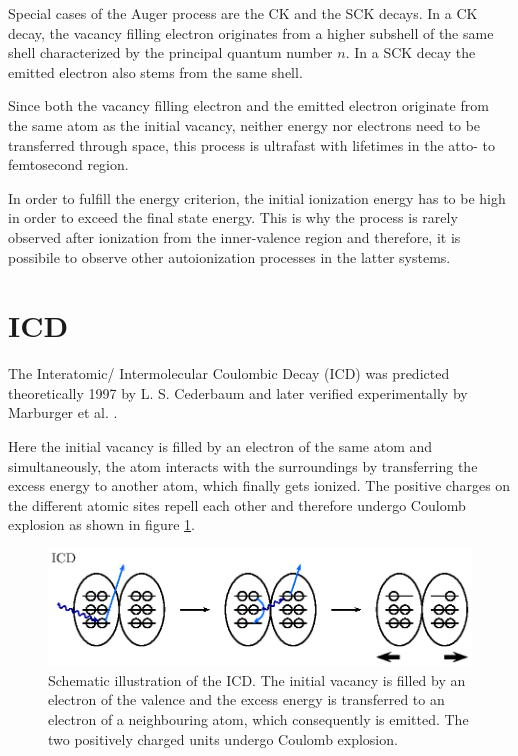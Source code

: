 Special cases of the Auger process are the \ac{CK} and the \ac{SCK} decays.
In a \ac{CK} decay, the vacancy filling electron originates from a higher subshell
of the same shell characterized by the principal quantum number $n$. In a \ac{SCK}
decay the emitted electron also stems from the same shell. \cite{Coster35}

Since both the vacancy filling electron and the emitted electron originate
from the same atom as the initial vacancy, neither energy nor electrons need
to be transferred through space, this process is ultrafast with lifetimes
in the atto- to femtosecond region. \cite{}

In order to fulfill the energy criterion, the initial ionization energy has to
be high in order to exceed the final state energy. This is why
the process is rarely observed after
ionization from the inner-valence region and therefore, it is possibile to
observe other autoionization processes in the latter systems.

\section{\acl{ICD}}
The Interatomic/ Intermolecular Coulombic Decay (ICD) was predicted
theoretically 1997 by L. S. Cederbaum \cite{Cederbaum97}
and later verified experimentally by Marburger et al. \cite{Marburger03}.

Here the initial vacancy is filled by an electron of the same atom and simultaneously,
the atom interacts with the surroundings by
transferring the excess energy to another atom, which finally gets ionized. The
positive charges on the different atomic sites repell each other and therefore undergo
Coulomb explosion as shown in figure \ref{figure:icd_process}.

\begin{figure}[h]
 \centering
 \includegraphics{pics/icd-pspic.eps}
 \caption{Schematic illustration of the \ac{ICD}. The initial vacancy is filled
          by an electron of the valence and the excess energy is transferred to
          an electron of a neighbouring atom, which consequently is emitted.
          The two positively charged units undergo Coulomb explosion.}
 \label{figure:icd_process}
\end{figure}

